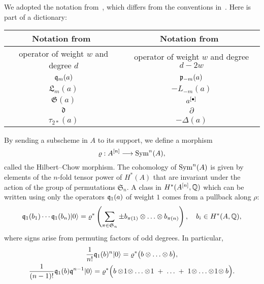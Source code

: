 \begin{remark}
We adopted the notation from~\cite{LiQinWang}, which differs from the conventions in~\cite{LehnSorger}. Here is part of a dictionary:
\begin{center}
\begin{tabular}{c|c} 
Notation from~\cite{LiQinWang} & Notation from~\cite{LehnSorger} \\\hline
operator of weight $w$ and degree $d$ & operator of weight $w$ and degree $d-2w$\\
$\mathfrak{q}_m(a) $ & $\mathfrak{p}_{-m}(a)$ \\
$ \mathfrak{L}_m(a) $ & $ - L_{-m}(a)$ \\
$\mathfrak{G}(a)$ & $a^{[\bullet]}$\\
$ \mathfrak{d} $ & $ \partial $ \\
$\tau_{2*}(a)$& $-\Delta(a)$
\end{tabular}
\end{center}
\end{remark}

By sending a subscheme in $A$ to its support, we define a morphism
\begin{equation}\label{HilbertChow}
\varrho : A^{[n]} \longrightarrow \operatorname{Sym}^n(A),
\end{equation}
called the Hilbert--Chow morphism. The cohomology of $\operatorname{Sym}^n(A)$ is given by elements of the $n$-fold tensor power of $H^*(A)$ that are invariant under the action of the group of permutations $\mathfrak{S}_n$. A class in $H^*(A^{[n]},\mathbb{Q})$ which can be written using only the operators $\mathfrak{q}_1(a)$ of weight $1$ comes from a pullback along $\rho$:
\begin{equation}
\label{qSym}
\mathfrak{q}_1(b_1)\cdots \mathfrak{q}_1(b_n)|0\rangle = \varrho^*\left( \sum_{\pi\in\mathfrak{S}_n } \pm b_{\pi(1)}\otimes\ldots\otimes b_{\pi(n)} \right), \quad b_i\in H^*(A,\mathbb{Q}),
\end{equation}
where signs arise from permuting factors of odd degrees. In particular,
\begin{gather} \label{q0primitive}
\frac{1}{n!}\mathfrak{q}_1(b)^n |0\rangle = \varrho^*\big( b\otimes \ldots \otimes b\big),
\\ \label{q1primitive}
\frac{1}{(n-1)!}\mathfrak{q}_1(b)\mathfrak{q}^{n-1}|0\rangle =\varrho^*\Big( b\otimes\! 1\!\otimes\ldots\otimes\! 1\; + \;\ldots\; +\; 1\!\otimes\ldots\otimes\! 1\! \otimes b\Big) .
\end{gather}


